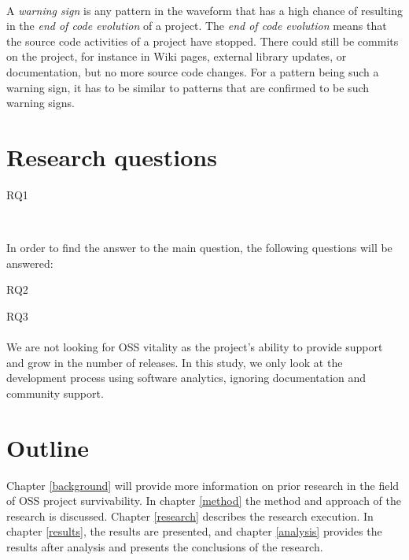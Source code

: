 \paragraph{}
A \emph{warning sign }\rm is any pattern in the waveform that has a high chance
of resulting in the \emph{end of code evolution }\rm of a project. The \emph{end
of code evolution }\rm means that the source code activities of a project have
stopped. There could still be commits on the project, for instance in Wiki
pages, external library updates, or documentation, but no more source code
changes. For a pattern being such a warning sign, it has to be similar to
patterns that are confirmed to be such warning signs.



\section{Research questions}
\label{questions}

\begin{description}
	\item[RQ1] \emph{\researchQuestion}\\[0.3cm]
\end{description}

\noindent
In order to find the answer to the main question, the following
questions will be answered:
\begin{description}
	\item[RQ2] \emph{\subQuestionOne}
	\item[RQ3] \emph{\subQuestionTwo}
\end{description}

\paragraph{}
We are not looking for OSS vitality as the project's ability to provide support
and grow in the number of releases. In this study, we only look at the
development process using software analytics, ignoring documentation and
community support.

\section{Outline}

Chapter \ref{background} will provide more information on prior research in the
field of OSS project survivability. In chapter \ref{method} the method and
approach of the research is discussed. Chapter \ref{research} describes the
research execution. In chapter \ref{results}, the results are presented, and
chapter \ref{analysis} provides the results after analysis and presents the
conclusions of the research.

